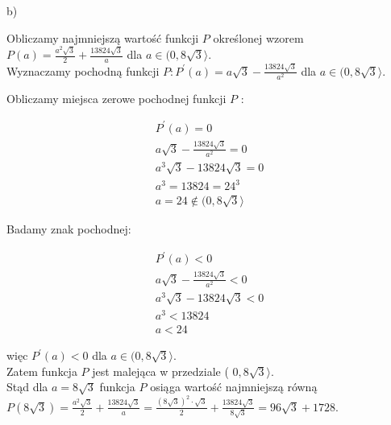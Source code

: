\documentclass[10pt]{article}
\begin{document}
b)

Obliczamy najmniejszą wartość funkcji $P$ określonej wzorem $P(a)=\frac{a^{2} \sqrt{3}}{2}+\frac{13824 \sqrt{3}}{a}$ dla $a \in(0,8 \sqrt{3}\rangle$.\\
Wyznaczamy pochodną funkcji $P: P^{\prime}(a)=a \sqrt{3}-\frac{13824 \sqrt{3}}{a^{2}}$ dla $a \in(0,8 \sqrt{3}\rangle$.

Obliczamy miejsca zerowe pochodnej funkcji $P$ :

$$
\begin{gathered}
P^{\prime}(a)=0 \\
a \sqrt{3}-\frac{13824 \sqrt{3}}{a^{2}}=0 \\
a^{3} \sqrt{3}-13824 \sqrt{3}=0 \\
a^{3}=13824=24^{3} \\
a=24 \notin(0,8 \sqrt{3}\rangle
\end{gathered}
$$

Badamy znak pochodnej:

$$
\begin{gathered}
P^{\prime}(a)<0 \\
a \sqrt{3}-\frac{13824 \sqrt{3}}{a^{2}}<0 \\
a^{3} \sqrt{3}-13824 \sqrt{3}<0 \\
a^{3}<13824 \\
a<24
\end{gathered}
$$

więc $P^{\prime}(a)<0$ dla $a \in(0,8 \sqrt{3}\rangle$.\\
Zatem funkcja $P$ jest malejąca w przedziale ( $0,8 \sqrt{3}\rangle$.\\
Stąd dla $a=8 \sqrt{3}$ funkcja $P$ osiąga wartość najmniejszą równą\\
$P(8 \sqrt{3})=\frac{a^{2} \sqrt{3}}{2}+\frac{13824 \sqrt{3}}{a}=\frac{(8 \sqrt{3})^{2} \cdot \sqrt{3}}{2}+\frac{13824 \sqrt{3}}{8 \sqrt{3}}=96 \sqrt{3}+1728$.
\end{document}
